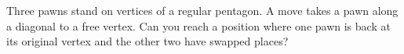 Three pawns stand on vertices of a regular pentagon. A move takes a pawn along a diagonal to a free vertex. Can you reach a position where one pawn is back at its original vertex and the other two have swapped places?

